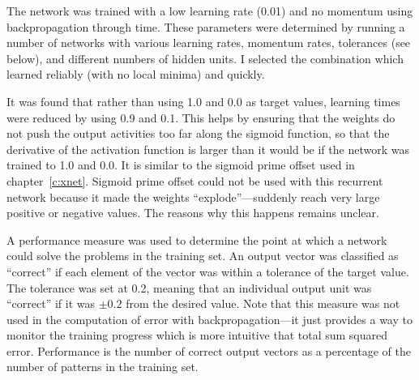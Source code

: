 The network was trained with a low learning rate (0.01) and no momentum
using backpropagation through time.
These parameters were determined by running a number of networks with
various learning rates, momentum rates, tolerances (see below), and
different numbers of hidden units. I selected the combination which
learned reliably (with no local minima) and quickly.

It was found that rather than using 1.0 and 0.0 as target values, learning
times were reduced by using 0.9 and 0.1.  This helps by ensuring that the
weights do not push the output activities too far along the sigmoid
function, so that the derivative of the activation function is larger than
it would be if the network was trained to 1.0 and 0.0. It is similar to the
sigmoid prime offset used in chapter~\ref{c:xnet}. Sigmoid prime offset
could not be used with this recurrent network because it made the weights
``explode''---suddenly reach very large positive or negative values.   The
reasons why this happens remains unclear.

A performance measure was used to determine the point at which a network
could solve the problems in the
training set.  An output vector was classified as
``correct'' if each element
of the vector was within a tolerance of the target
value.  The tolerance was set at 0.2, meaning that an individual output
unit
was
``correct'' if it was $\pm0.2$ from the desired value.  Note that this
measure was not used in the computation of error with backpropagation---it
just provides a way to monitor the training progress which is more
intuitive that total sum squared error.
Performance is the number of correct output vectors as a
percentage of the number of patterns in the training set.

